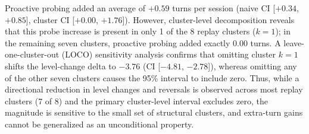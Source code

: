 \documentclass[runningheads]{llncs}
\begin{document}
Proactive probing added an average of $+0.59$ turns per session (naive CI [$+0.34$, $+0.85$], cluster CI [$+0.00$, $+1.76$]). However, cluster-level decomposition reveals that this probe increase is present in only 1 of the 8 replay clusters ($k=1$); in the remaining seven clusters, proactive probing added exactly 0.00 turns. A leave-one-cluster-out (LOCO) sensitivity analysis confirms that omitting cluster $k=1$ shifts the level-change delta to $-3.76$ (CI [$-4.81$, $-2.78$]), whereas omitting any of the other seven clusters causes the 95\% interval to include zero. Thus, while a directional reduction in level changes and reversals is observed across most replay clusters (7 of 8) and the primary cluster-level interval excludes zero, the magnitude is sensitive to the small set of structural clusters, and extra-turn gains cannot be generalized as an unconditional property.
\end{document}
